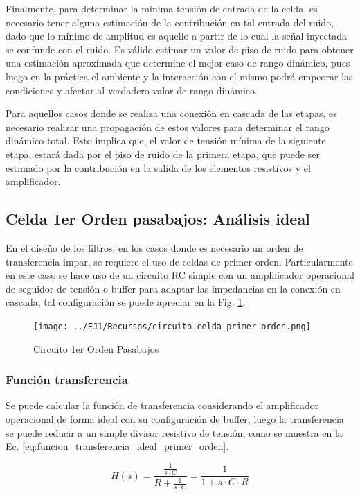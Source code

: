 Finalmente, para determinar la m\'inima tensi\'on de entrada de la celda, es necesario tener alguna estimaci\'on de la contribuci\'on en tal entrada del ruido,
dado que lo m\'inimo de amplitud es aquello a partir de lo cual la se\~nal inyectada se confunde con el ruido. Es v\'alido estimar un valor de piso de ruido para obtener
una estimaci\'on aproximada que determine el mejor caso de rango din\'amico, pues luego en la pr\'actica el ambiente y la interacci\'on con el mismo podr\'a empeorar las condiciones
y afectar al verdadero valor de rango din\'amico.

Para aquellos casos donde se realiza una conexi\'on en cascada de las etapas, es necesario realizar una propagaci\'on de estos valores para determinar el rango din\'amico total. Esto implica que,
el valor de tensi\'on m\'inima de la siguiente etapa, estar\'a dada por el piso de ruido de la primera etapa, que puede ser estimado por la contribuci\'on en la salida de los elementos resistivos y el amplificador.

\subsection{Celda 1er Orden pasabajos: An\'alisis ideal}
En el dise\~no de los filtros, en los casos donde es necesario un orden de transferencia impar, se requiere el uso de celdas de primer orden.
Particularmente en este caso se hace uso de un circuito RC simple con un amplificador operacional de seguidor de tensi\'on o buffer para adaptar las impedancias en la conexi\'on en cascada,
tal configuraci\'on se puede apreciar en la Fig. \ref{fig:circuito_pasabajos_primer_orden}.

\begin{figure}[H]
	\centering
	\texttt{[image: ../EJ1/Recursos/circuito\_celda\_primer\_orden.png]}
	\caption{Circuito 1er Orden Pasabajos}
	\label{fig:circuito_pasabajos_primer_orden}
\end{figure}

\subsubsection{Funci\'on transferencia}
Se puede calcular la funci\'on de transferencia considerando el amplificador operacional de forma ideal con su configuraci\'on de buffer,
luego la transferencia se puede reducir a un simple divisor resistivo de tensi\'on, como se muestra en la Ec. \ref{eq:funcion_transferencia_ideal_primer_orden}.

\begin{equation}
H(s) = \frac{\frac{1}{s \cdot C}}{R + \frac{1}{s \cdot C}} = \frac{1}{1 + s \cdot C \cdot R}
\label{eq:funcion_transferencia_ideal_primer_orden}
\end{equation}

